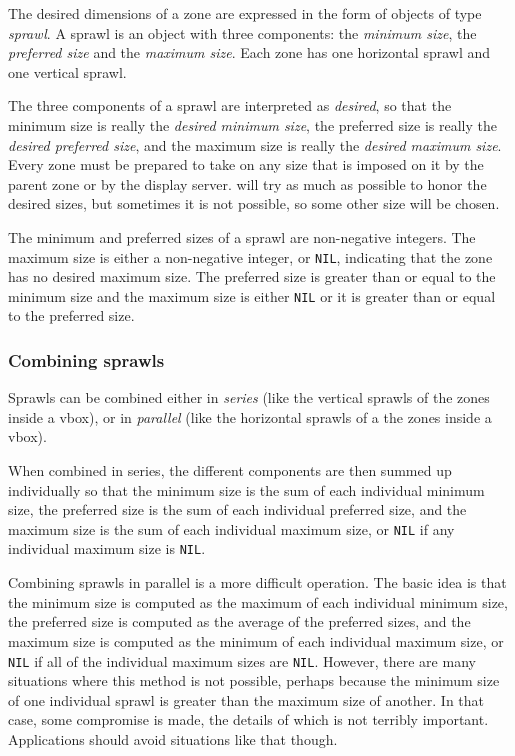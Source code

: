 The desired dimensions of a zone are expressed in the form of objects
of type \emph{sprawl}.  A sprawl is an object with three components:
the \emph{minimum size}, the \emph{preferred size} and the \emph{maximum
  size}.  Each zone has one horizontal sprawl and one vertical sprawl.

The three components of a sprawl are interpreted as \emph{desired}, so
that the minimum size is really the \emph{desired minimum size}, the
preferred size is really the \emph{desired preferred size}, and the
maximum size is really the \emph{desired maximum size}.  Every zone
must be prepared to take on any size that is imposed on it by the
parent zone or by the display server.  \clim{} will try as much as
possible to honor the desired sizes, but sometimes it is not possible,
so some other size will be chosen.

The minimum and preferred sizes of a sprawl are non-negative
integers.  The maximum size is either a non-negative integer, or
\texttt{NIL}, indicating that the zone has no desired maximum size. 
The preferred size is greater than or equal to the minimum size and
the maximum size is either \texttt{NIL} or it is greater than or equal
to the preferred size. 

\subsubsection{Combining sprawls}

Sprawls can be combined either in \emph{series} (like the vertical
sprawls of the zones inside a vbox), or in \emph{parallel} (like the
horizontal sprawls of a the zones inside a vbox).  

When combined in series, the different components are then summed up
individually so that the minimum size is the sum of each individual
minimum size, the preferred size is the sum of each individual
preferred size, and the maximum size is the sum of each individual
maximum size, or \texttt{NIL} if any individual maximum size is
\texttt{NIL}.

Combining sprawls in parallel is a more difficult operation.  The
basic idea is that the minimum size is computed as the maximum of each
individual minimum size, the preferred size is computed as the average
of the preferred sizes, and the maximum size is computed as the
minimum of each individual maximum size, or \texttt{NIL} if all of the
individual maximum sizes are \texttt{NIL}.  However, there are many
situations where this method is not possible, perhaps because the
minimum size of one individual sprawl is greater than the maximum size
of another.  In that case, some compromise is made, the details of
which is not terribly important.  Applications should avoid situations
like that though. 

